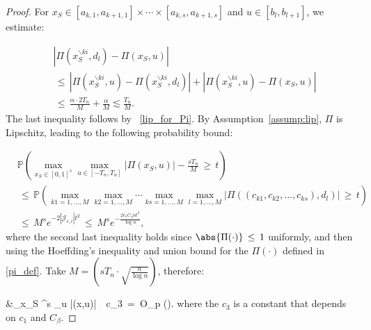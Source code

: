 \documentclass[twoside,11pt]{article}
\begin{document}
\begin{proof}
For $x_S \in [a_{k,1}, a_{k+1,1}] \times \cdots \times [a_{k,s}, a_{k+1,s}]$ and $u \in [b_l, b_{l+1}]$, we estimate:

\begin{align*}
    &|\Pi(x_S^{\backslash ki}, d_l) - \Pi(x_S,u)| \\
    &\,\le\, |\Pi(x_S^{\backslash ki},u) - \Pi(x_S^{\backslash ki}, d_l)| + |\Pi(x_S^{\backslash ki}, u) - \Pi(x_S,u)| \\
    &\,\le\, \frac{\alpha \cdot 2T_n}{M} + \frac{\alpha}{M} \lesssim \frac{T_n}{M}.
\end{align*}
The last inequality follows by ~\eqref{lip_for_Pi}. 
By Assumption~\ref{assump:lip}, $\Pi$ is Lipschitz, leading to the following probability bound:

\begin{align*}
    &\mathbb{P}\left(\max_{x_S \in [0,1]^s} \max_{u \in [-T_n,T_n]} |\Pi(x_S,u)| - \frac{sT_n}{M} \,\ge\, t\right) \\ &\,\leq\, \mathbb{P}\left ( \max_{k1= 1, \dots, M} \max_{k2= 1, \dots, M} \cdots \max_{ks= 1, \dots, M} \max_{l= 1, \dots, M} |\Pi((c_{k1}, c_{k2}, \ldots, c_{ks}), d_l)| \,\ge\, t \right ) \\
    &\,\le\, M^s e^{-2\left|\mathcal{J}_{e,l} \right| t^2} \,\leq\, M^s e^{-\frac{2 c_1C_{\beta} n t^2}{\log n}},
\end{align*}
where the second last inequality holds since $\abs{\Pi(\cdot)} \,\leq\, 1$ uniformly, and then using the Hoeffding's inequality and union bound for the $\Pi(\cdot)$ defined in \eqref{pi_def}. 
Take $M = \left(sT_n \cdot \sqrt{\frac{n}{\log n}}\right)$, therefore:

\beq 
\label{in1116}
    &\max_{x_S \in [0,1]^s} \max_{u \in [-T_n, T_n]} |\Pi(x,u)| \,\leq\, c_3 \,=\, O_p \left(\right).
\beq 
where the $c_3$ is a constant that depends on $c_1$ and $C_{\beta}$. 


\end{proof}
\end{document}
